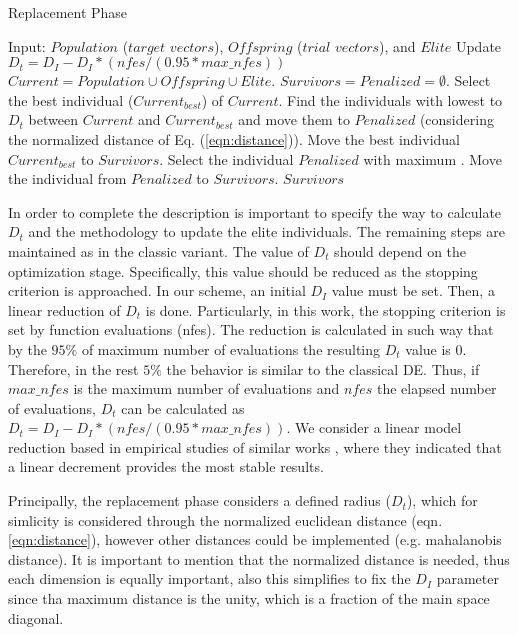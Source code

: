 \begin{algorithm}[H]
  \scriptsize
	\caption{Replacement Phase} \label{alg:Replacement}
	\begin{algorithmic}[1]
	\STATE Input: $Population$ ($target$ $vectors$), $Offspring$ ($trial$ $vectors$), and $Elite$
	\STATE Update $D_t = D_I - D_I *(nfes/(0.95*max\_nfes)) $ 
	\STATE $Current = Population \cup Offspring \cup Elite$.
	\STATE $Survivors = Penalized = \emptyset$.
	   \STATE Select the best individual ($Current_{best}$) of $Current$.
	   \STATE Find the individuals with lowest \DCN{} to $D_t$ between $Current$ and $Current_{best}$ and move them to $Penalized$ (considering the normalized distance of Eq. (\ref{eqn:distance})).
	   \STATE Move the best individual $Current_{best}$ to $Survivors$.
	\ENDWHILE
	   \STATE Select the individual $Penalized$ with maximum \DCN{}.
	   \STATE Move the individual from $Penalized$ to $Survivors$.
	\ENDWHILE
       \RETURN $Survivors$
\end{algorithmic}
\end{algorithm}


In order to complete the description is important to specify the way to calculate $D_t$ and the methodology to update the 
elite individuals.
%
The remaining steps are maintained as in the classic \DE{} variant.
%
The value of $D_t$ should depend on the optimization stage.
%
Specifically, this value should be reduced as the stopping criterion is approached.
%
In our scheme, an initial $D_I$ value must be set.
%
Then, a linear reduction of $D_t$ is done.
%
Particularly, in this work, the stopping criterion is set by function evaluations (nfes).
%
The reduction is calculated in such way that by the $95\%$ of maximum number of evaluations the resulting $D_t$ value is $0$.
%
Therefore, in the rest $5\%$ the behavior is similar to the classical DE.
%
Thus, if $max\_nfes$ is the maximum number of evaluations and $nfes$ the elapsed number of evaluations, $D_t$ can be calculated as $D_t=D_I - D_I *(nfes/(0.95*max\_nfes))$.
%
We consider a linear model reduction based in empirical studies of similar works \cite{segura2016novel}, where they indicated that a linear decrement provides the most stable results.
%

Principally, the replacement phase considers a defined radius ($D_t$), which for simlicity is considered through the normalized euclidean distance (eqn. \ref{eqn:distance}), however other distances could be implemented (e.g. mahalanobis distance).
%
It is important to mention that the normalized distance is needed, thus each dimension is equally important, also this simplifies to fix the $D_I$ parameter since tha maximum distance is the unity, which is a fraction of the main space diagonal.

